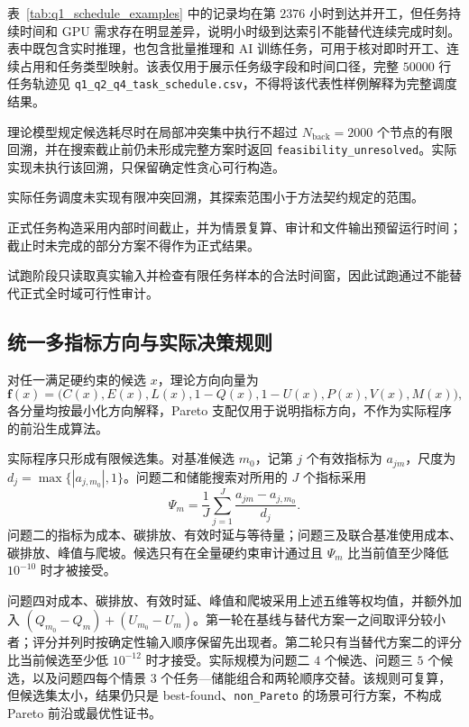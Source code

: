 表~\ref{tab:q1_schedule_examples} 中的记录均在第 $2376$ 小时到达并开工，但任务持续时间和 GPU 需求存在明显差异，说明小时级到达索引不能替代连续完成时刻。表中既包含实时推理，也包含批量推理和 AI 训练任务，可用于核对即时开工、连续占用和任务类型映射。该表仅用于展示任务级字段和时间口径，完整 $50000$ 行任务轨迹见 \texttt{q1\_q2\_q4\_task\_schedule.csv}，不得将该代表性样例解释为完整调度结果。

理论模型规定候选耗尽时在局部冲突集中执行不超过 $N_{\mathrm{back}}=2000$ 个节点的有限回溯，并在搜索截止前仍未形成完整方案时返回 \texttt{feasibility\_unresolved}。实际实现未执行该回溯，只保留确定性贪心可行构造。

实际任务调度未实现有限冲突回溯，其探索范围小于方法契约规定的范围。

正式任务构造采用内部时间截止，并为情景复算、审计和文件输出预留运行时间；截止时未完成的部分方案不得作为正式结果。

试跑阶段只读取真实输入并检查有限任务样本的合法时间窗，因此试跑通过不能替代正式全时域可行性审计。


\subsection{统一多指标方向与实际决策规则}

对任一满足硬约束的候选 $x$，理论方向向量为
\begin{equation}
\mathbf f(x)=\bigl(C(x),E(x),L(x),1-Q(x),1-U(x),P(x),V(x),M(x)\bigr),
\end{equation}
各分量均按最小化方向解释，Pareto 支配仅用于说明指标方向，不作为实际程序的前沿生成算法。

实际程序只形成有限候选集。对基准候选 $m_0$，记第 $j$ 个有效指标为 $a_{jm}$，尺度为 $d_j=\max\{|a_{j,m_0}|,1\}$。问题二和储能搜索对所用的 $J$ 个指标采用
\begin{equation}
\Psi_m=\frac{1}{J}\sum_{j=1}^{J}\frac{a_{jm}-a_{j,m_0}}{d_j}.
\end{equation}
问题二的指标为成本、碳排放、有效时延与等待量；问题三及联合基准使用成本、碳排放、峰值与爬坡。候选只有在全量硬约束审计通过且 $\Psi_m$ 比当前值至少降低 $10^{-10}$ 时才被接受。

问题四对成本、碳排放、有效时延、峰值和爬坡采用上述五维等权均值，并额外加入 $(Q_{m_0}-Q_m)+(U_{m_0}-U_m)$。第一轮在基线与替代方案一之间取评分较小者；评分并列时按确定性输入顺序保留先出现者。第二轮只有当替代方案二的评分比当前候选至少低 $10^{-12}$ 时才接受。实际规模为问题二 $4$ 个候选、问题三 $5$ 个候选，以及问题四每个情景 $3$ 个任务—储能组合和两轮顺序交替。该规则可复算，但候选集太小，结果仍只是 best-found、\texttt{non\_Pareto} 的场景可行方案，不构成 Pareto 前沿或最优性证书。

